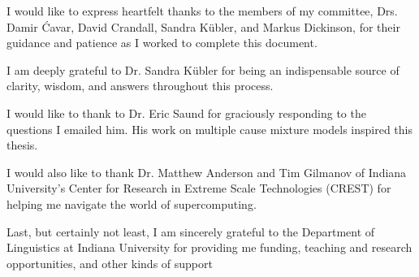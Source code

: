 \documentclass[showabstract,showacknowledgments,showpreface,showdedication]{iuphd}
\theoremstyle{remark}
\theoremstyle{remark}
\theoremstyle{remark}
\theoremstyle{remark}
\begin{document}
\begin{acknowledgments}
I would like to express heartfelt thanks to the members of my committee, Drs. Damir \'{C}avar, David Crandall, Sandra K\"{u}bler, and Markus Dickinson, for their guidance and patience as I worked to complete this document. 


I am deeply grateful to Dr. Sandra K\"{u}bler for being an indispensable source of clarity, wisdom, and answers throughout this process.

I would like to thank to Dr. Eric Saund for graciously responding to the questions I emailed him. His work on multiple cause mixture models inspired this thesis.

I would also like to thank Dr. Matthew Anderson and Tim Gilmanov of Indiana University’s Center for Research in Extreme Scale Technologies (CREST) for helping me navigate the world of supercomputing.

Last, but certainly not least, I am sincerely grateful to the Department of Linguistics at Indiana University for providing me funding, teaching and research opportunities, and other kinds of support
 \end{acknowledgments}
% 
% 
% 
% 
\end{document}
